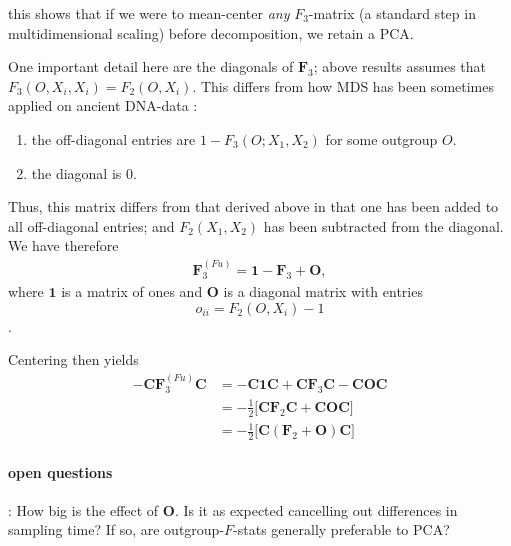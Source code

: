 \documentclass[10pt,a4paper]{article}
\newcommand{\MC}{\mathbf{C}} %
\newcommand{\MF}{\mathbf{F}_2} %
\newcommand{\MFT}{\mathbf{F}_3} %
\begin{document}
this shows that if we were to mean-center \emph{any} $F_3$-matrix (a standard step in multidimensional scaling) before decomposition, we retain a PCA.

One important detail here are the diagonals of $\MFT$; above results assumes that $F_3(O, X_i, X_i) = F_2(O, X_i)$. This differs from how MDS has been sometimes applied on ancient DNA-data \citep{fu2016}:
\begin{enumerate}
	\item the off-diagonal entries are $1 - F_3(O; X_1, X_2)$ for some outgroup $O$.
	\item the diagonal is 0.
\end{enumerate}
Thus, this matrix differs from that derived above in that one has been added to all off-diagonal entries; and $F_2(X_1,X_2)$ has been subtracted from the diagonal. We have therefore
\begin{align}
\MFT^{(Fu)} = \mathbf{1} - \MFT + \mathbf{O},
\end{align}
where $\mathbf{1}$ is a matrix of ones and $\mathbf{O}$ is a diagonal matrix with entries
$$o_{ii} = F_2(O, X_i) -1$$.

Centering then yields
\begin{align}
-\MC\MFT^{(Fu)}\MC &= -\MC\mathbf{1}\MC + \MC\MFT\MC - \MC\mathbf{O}\MC\nonumber\\
                  &= -\frac{1}{2}\big[\MC\MF\MC +\MC\mathbf{O}\MC\big]\nonumber\\
                  &= -\frac{1}{2}\big[\MC(\MF + \mathbf{O})\MC\big]
\end{align}

\paragraph{open questions}: How big is the effect of $\mathbf{O}$. Is it as expected cancelling out differences in sampling time? If so, are outgroup-$F$-stats generally preferable to PCA?

\end{document}
